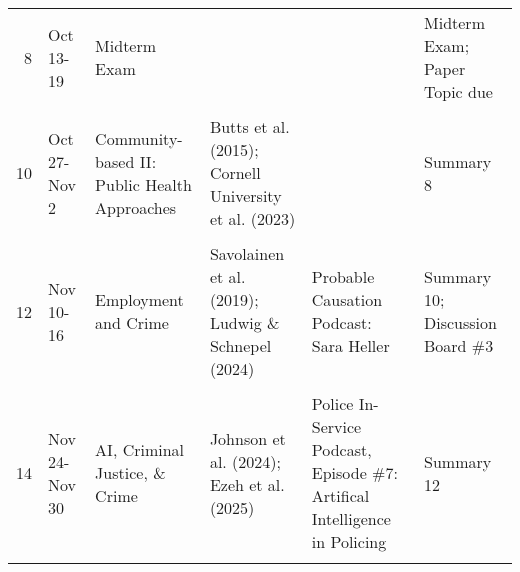 \documentclass[11pt,]{article}
\begin{document}
\begin{table}[!h]
{\begin{tabular}{rl>{\raggedright\arraybackslash}p{7cm}>{\raggedright\arraybackslash}p{7cm}>{\raggedright\arraybackslash}p{4cm}>{\raggedright\arraybackslash}p{4cm}}
8 & Oct 13-19 & Midterm Exam &  &  & Midterm Exam; Paper Topic due\\
\cellcolor{gray!10}{9} & \cellcolor{gray!10}{Oct 20-26} & \cellcolor{gray!10}{Community-based I: CPTED} & \cellcolor{gray!10}{Welsh \& Farrington (2008); Cozens \& Love (2015)} & \cellcolor{gray!10}{} & \cellcolor{gray!10}{Summary 7}\\
10 & Oct 27-Nov 2 & Community-based II: Public Health Approaches & Butts et al. (2015); Cornell University et al. (2023) &  & Summary 8\\
\addlinespace
\cellcolor{gray!10}{11} & \cellcolor{gray!10}{Nov 3-9} & \cellcolor{gray!10}{Technology \& Surveilance} & \cellcolor{gray!10}{Connealy et al. (2024), Piza et al. (2024)} & \cellcolor{gray!10}{} & \cellcolor{gray!10}{Summary 9; Paper Outline due}\\
12 & Nov 10-16 & Employment and Crime & Savolainen et al. (2019); Ludwig \& Schnepel (2024) & Probable Causation Podcast: Sara Heller & Summary 10; Discussion Board \#3\\
\cellcolor{gray!10}{13} & \cellcolor{gray!10}{Nov 17-23} & \cellcolor{gray!10}{Guns, Policy, \& Crime} & \cellcolor{gray!10}{Smart et al. (2023) RAND Summary; Cook (2018)} & \cellcolor{gray!10}{} & \cellcolor{gray!10}{Summary 11}\\
14 & Nov 24-Nov 30 & AI, Criminal Justice, \& Crime & Johnson et al. (2024); Ezeh et al. (2025) & Police In-Service Podcast, Episode \#7: Artifical Intelligence in Policing & Summary 12\\
\cellcolor{gray!10}{15} & \cellcolor{gray!10}{Dec 1-7} & \cellcolor{gray!10}{Final Exam} & \cellcolor{gray!10}{} & \cellcolor{gray!10}{} & \cellcolor{gray!10}{Final Exam; Final Paper due}\\
\bottomrule
\end{tabular}}
\end{table}
\end{document}
